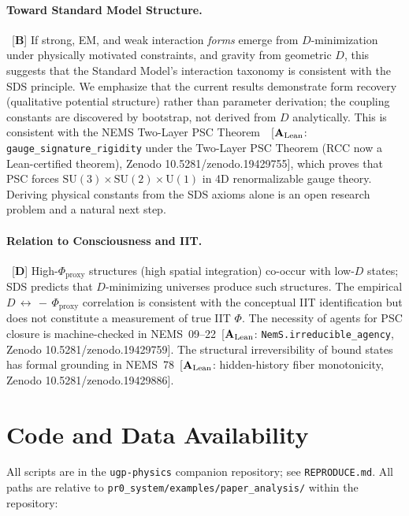 \documentclass[12pt]{article}
\newcommand{\CatAL}{\ensuremath{\textbf{A}_{\rm Lean}}}
\newcommand{\CatB}{\textbf{B}}
\newcommand{\CatD}{\textbf{D}}
\begin{document}
\paragraph{Toward Standard Model Structure.}~[$\CatB$] If strong, EM, and weak interaction \emph{forms} emerge from $D$-minimization under physically motivated constraints, and gravity from geometric $D$, this suggests that the Standard Model's interaction taxonomy is consistent with the SDS principle. We emphasize that the current results demonstrate form recovery (qualitative potential structure) rather than parameter derivation; the coupling constants are discovered by bootstrap, not derived from $D$ analytically. This is consistent with the NEMS Two-Layer PSC Theorem~\cite{SpivackPSCOpt}~[$\CatAL$: \texttt{gauge\_signature\_rigidity} under the Two-Layer PSC Theorem (RCC now a Lean-certified theorem), Zenodo 10.5281/\allowbreak zenodo.19429755], which proves that PSC forces $\mathrm{SU}(3)\times\mathrm{SU}(2)\times\mathrm{U}(1)$ in 4D renormalizable gauge theory. Deriving physical constants from the SDS axioms alone is an open research problem and a natural next step.

\paragraph{Relation to Consciousness and IIT.}~[$\CatD$] High-$\Phi_{\mathrm{proxy}}$ structures (high spatial integration) co-occur with low-$D$ states; SDS predicts that $D$-minimizing universes produce such structures. The empirical $D\,\leftrightarrow\,-\,\Phi_{\mathrm{proxy}}$ correlation is consistent with the conceptual IIT identification but does not constitute a measurement of true IIT $\Phi$.
The necessity of agents for PSC closure is machine-checked in NEMS~09--22~[$\CatAL$: \texttt{NemS.irreducible\_agency}, Zenodo 10.5281/\allowbreak zenodo.19429759]. The structural irreversibility of bound states has formal grounding in NEMS~78~[$\CatAL$: hidden-history fiber monotonicity, Zenodo 10.5281/\allowbreak zenodo.19429886].

\section{Code and Data Availability}\label{sec:repro}
All scripts are in the \texttt{ugp-physics} companion repository; see \texttt{REPRODUCE.md}.
All paths are relative to \texttt{pr0\_system/examples/paper\_analysis/} within the repository:
\end{document}
